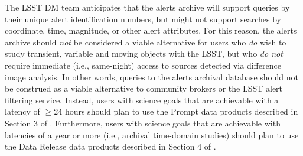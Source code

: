 \documentclass[DM,lsstdraft,authoryear,toc]{lsstdoc}
\begin{document}
The LSST DM team anticipates that the alerts archive will support queries by their unique alert identification numbers, but might not support searches by coordinate, time, magnitude, or other alert attributes. For this reason, the alerts archive should {\em not} be considered a viable alternative for users who {\em do} wish to study transient, variable and moving objects with the LSST, but who {\em do not} require immediate (i.e., same-night) access to sources detected via difference image analysis. In other words, queries to the alerts archival database should not be construed as a viable alternative to community brokers or the LSST alert filtering service. Instead, users with science goals that are achievable with a latency of $\geq$24 hours should plan to use the Prompt data products described in Section 3 of . Furthermore, users with science goals that are achievable with latencies of a year or more (i.e., archival time-domain studies) should plan to use the Data Release data products described in Section 4 of .



\end{document}
